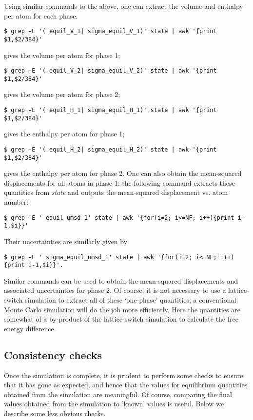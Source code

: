 \documentclass{report}
\begin{document}
Using similar commands to the above, one can extract the volume and enthalpy per atom for each phase.
\begin{verbatim}
$ grep -E '( equil_V_1| sigma_equil_V_1)' state | awk '{print $1,$2/384}'
\end{verbatim}
gives the volume per atom for phase 1;
\begin{verbatim}
$ grep -E '( equil_V_2| sigma_equil_V_2)' state | awk '{print $1,$2/384}'
\end{verbatim}
gives the volume per atom for phase 2;
\begin{verbatim}
$ grep -E '( equil_H_1| sigma_equil_H_1)' state | awk '{print $1,$2/384}'
\end{verbatim}
gives the enthalpy per atom for phase 1;
\begin{verbatim}
$ grep -E '( equil_H_2| sigma_equil_H_2)' state | awk '{print $1,$2/384}'
\end{verbatim}
gives the enthalpy per atom for phase 2. One can also obtain the mean-squared displacements for all atoms in phase 1: the following command extracts
these quantities from \emph{state} and outputs the mean-squared displacement vs. atom number:
\begin{verbatim}
$ grep -E ' equil_umsd_1' state | awk '{for(i=2; i<=NF; i++){print i-1,$i}}'
\end{verbatim}
Their uncertainties are similarly given by 
\begin{verbatim}
$ grep -E ' sigma_equil_umsd_1' state | awk '{for(i=2; i<=NF; i++){print i-1,$i}}'.
\end{verbatim}
Similar commands can be used to obtain the mean-squared displacements and associated uncertainties for phase 2. Of course, it is not necessary to use
a lattice-switch simulation to extract all of these `one-phase' quantities; a conventional Monte Carlo simulation will do the job more efficiently.
Here the quantities are somewhat of a by-product of the lattice-switch simulation to calculate the free energy difference.

\subsection{Consistency checks}
Once the simulation is complete, it is prudent to perform some checks to ensure that it has gone as expected, and hence that the values for equilibrium
quantities obtained from the simulation are meaningful. Of course, comparing the final values obtained from the simulation to 'known' values is useful.
Below we describe some less obvious checks.
\end{document}
